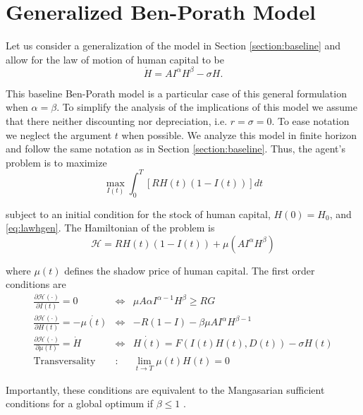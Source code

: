  
\section{Generalized Ben-Porath Model} \label{section:generalized}
Let us consider a generalization of the model in Section \ref{section:baseline} and allow for the law of motion of human capital to be
\begin{equation}
\dot{H} = A I^{\alpha} H^{\beta} - \sigma H \label{eq:lawhgen}.
\end{equation}

\indent This baseline Ben-Porath model is a particular case of this general formulation when $\alpha = \beta$. To simplify the analysis of the implications of this model we assume that there neither discounting nor depreciation, i.e. $r = \sigma = 0$. To ease notation we neglect the argument $t$ when possible. We analyze this model in finite horizon and follow the same notation as in Section \ref{section:baseline}. Thus, the agent's problem is to maximize
\begin{equation}
\max_{I(t)} \int _{0} ^{T} \left[ RH(t) \left(1 - I(t) \right) \right]dt
\end{equation}

\noindent subject to an initial condition for the stock of human capital, $H(0) = H_{0}$, and \eqref{eq:lawhgen}. The Hamiltonian of the problem is
\begin{equation}
\mathcal{H} = RH(t) \left(1 - I(t) \right) + \mu \left( A I^{\alpha} H^{\beta} \right)
\end{equation} 

where $\mu(t)$ defines the shadow price of human capital. The first order conditions are
\begin{eqnarray}
\frac{\partial \mathcal{H} (\cdot)}{\partial I(t)} = 0 &\Leftrightarrow& \mu A \alpha I^{\alpha - 1} H^{\beta} \geq RG \label{eq:focinvestmentgen} \\
\frac{\partial \mathcal{H} (\cdot)}{\partial H(t)} = - \dot{\mu(t)} &\Leftrightarrow& -R(1 - I) - \beta \mu A I^{\alpha} H^{\beta -1} \label{eq:focstockgen} \\ 
\frac{\partial \mathcal{H} (\cdot)}{\partial \mu(t)} = \dot{H} &\Leftrightarrow& \dot{H(t)} = F \left( I(t) H(t), D(t) \right) - \sigma H(t) \label{eq:focmotiongen} \\
\text{Transversality} &:& \lim_{t \rightarrow T} \mu(t) H(t) = 0 \label{eq:foctransversalitygen}
\end{eqnarray}

Importantly, these conditions are equivalent to the Mangasarian sufficient conditions for a global optimum if $\beta \leq 1$ \citep[see][]{mangasarian1966sufficient}.

